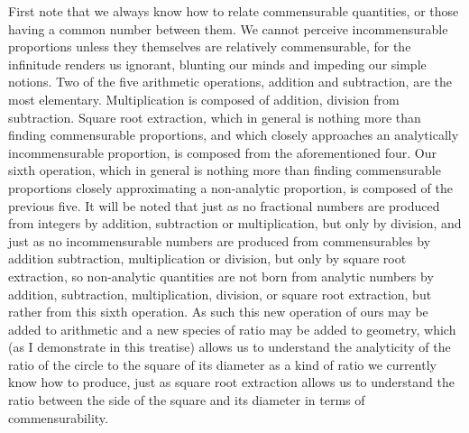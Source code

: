 \documentclass[11pt,letterpaper]{book}
\begin{document}
First note that we always know how to relate commensurable quantities, or
those having a common number between them. We cannot perceive incommensurable
proportions unless they themselves are relatively commensurable, for the
infinitude renders us ignorant, blunting our minds and impeding our simple
notions. Two of the five arithmetic operations, addition and subtraction, are
the most elementary. Multiplication is composed of addition, division from
subtraction. Square root extraction, which in general is nothing more than
finding commensurable proportions, and which closely approaches an analytically
incommensurable proportion, is composed from the aforementioned four. Our sixth
operation, which in general is nothing more than finding commensurable
proportions closely approximating a non-analytic proportion, is composed of the
previous five. It will be noted that just as no fractional numbers are produced
from integers by addition, subtraction or multiplication, but only by division,
and just as no incommensurable numbers are produced from commensurables by
addition subtraction, multiplication or division, but only by square root
extraction, so non-analytic quantities are not born from analytic numbers by
addition, subtraction, multiplication, division, or square root extraction, but
rather from this sixth operation. As such this new operation of ours may be
added to arithmetic and a new species of ratio may be added to geometry, which
(as I demonstrate in this treatise) allows us to understand the analyticity of
the ratio of the circle to the square of its diameter as a kind of ratio we
currently know how to produce, just as square root extraction allows us to
understand the ratio between the side of the square and its diameter in terms of
commensurability.
\end{document}
